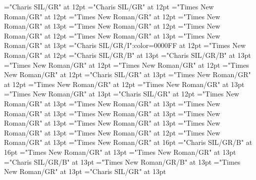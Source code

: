 \documentclass[a4paper]{article}
\begin{document}
\pagestyle{plain}
\sloppy
\setlength{\parfillskip}{0pt plus 1fil}
\font\xitemhi="Charis SIL/GR" at 12pt
\font\xitemte="Charis SIL/GR" at 12pt
\font\xitemxitemCmPossibilitypublishStemTransTypeAbbreviationPubbefore="Times New Roman/GR" at 12pt
\font\xitemxitemcomplexformrefsbefore="Times New Roman/GR" at 12pt
\font\xitemxitemdefinitionbefore="Times New Roman/GR" at 13pt
\font\xitemxitemdefinitionLcbefore="Times New Roman/GR" at 12pt
\font\xitemxitemdefinitionLdbefore="Times New Roman/GR" at 12pt
\font\xitemxitementryrefcomponentbefore="Times New Roman/GR" at 13pt
\font\xitemxitementryreftypebefore="Times New Roman/GR" at 13pt
\font\xitemxitemexamplebefore="Charis SIL/GR/I":color=0000FF at 12pt
\font\xitemxitemexamplesbefore="Times New Roman/GR" at 12pt
\font\xitemxitemheadwordbefore="Charis SIL/GR/B" at 13pt
\font\xitemxitemLexEntrypublishStemComponentTargetHeadWordRefbefore="Charis SIL/GR/B" at 13pt
\font\xitemxitemLexSensepublishStemDefinitionPubbefore="Times New Roman/GR" at 12pt
\font\xitemxitemLexSensepublishStemDefinitionPubLdbefore="Times New Roman/GR" at 12pt
\font\xitemxitemprimaryrefsbefore="Times New Roman/GR" at 12pt
\font\xitemxitempronunciationbefore="Charis SIL/GR" at 13pt
\font\xitemxitempronunciationsbefore="Times New Roman/GR" at 12pt
\font\xitemxitemsemanticdomainsbefore="Times New Roman/GR" at 12pt
\font\sensesensesensesbefore="Times New Roman/GR" at 13pt
\font\xitemxitemtranslationbefore="Times New Roman/GR" at 13pt
\font\xitemxitemtranslationLdbefore="Charis SIL/GR" at 12pt
\font\xitemxitemcrossrefbefore="Times New Roman/GR" at 13pt
\font\xitemxitemcrossreftargetsbefore="Times New Roman/GR" at 13pt
\font\xitemxitemcrossreftypebefore="Times New Roman/GR" at 13pt
\font\xitemxitemheadwordminorbefore="Times New Roman/GR" at 13pt
\font\xitemxitemmainentryrefbefore="Times New Roman/GR" at 13pt
\font\xitemxitemmainentryrefminorbefore="Times New Roman/GR" at 13pt
\font\xitemxitempronunciationminorbefore="Times New Roman/GR" at 13pt
\font\xitemxitemsensecrossrefbefore="Times New Roman/GR" at 12pt
\font\xitemxitemsensemainentryrefbefore="Times New Roman/GR" at 13pt
\font{}="Times New Roman/GR" at 16pt
\font{}="Charis SIL/GR/B" at 16pt
\font{}="Times New Roman/GR" at 13pt
\font\entryletDatadicBody="Times New Roman/GR" at 13pt
\font\headwordggoTeluINentryletDatadicBody="Charis SIL/GR/B" at 13pt
\font\spanenheadwordggoTeluINentryletDatadicBody="Times New Roman/GR/B" at 13pt
\font\pronunciationsentryletDatadicBody="Times New Roman/GR" at 13pt
\font\pronunciationggofonipaxemicpronunciationsentryletDatadicBody="Charis SIL/GR" at 13pt
\end{document}
